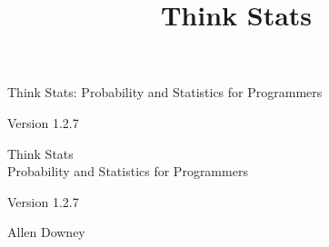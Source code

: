 \documentclass[12pt]{book}
\title{Think Stats}
\newcommand{\theversion}{1.2.7}
\begin{document}
\frontmatter




\newtheorem{ex}{Exercise}[chapter]

\begin{latexonly}

\renewcommand{\blankpage}{\thispagestyle{empty} \quad \newpage}



\thispagestyle{empty}

\begin{flushright}
\vspace*{2.0in}

\begin{spacing}{3}
{\huge Think Stats: Probability and Statistics for Programmers}\\
{\Large }
\end{spacing}

\vspace{0.25in}

Version \theversion

\vfill

\end{flushright}


\blankpage
\blankpage

\pagebreak
\thispagestyle{empty}

\begin{flushright}
\vspace*{2.0in}

\begin{spacing}{3}
{\huge Think Stats}\\
{\Large Probability and Statistics for Programmers}
\end{spacing}

\vspace{0.25in}

Version \theversion

\vspace{1in}


{\Large
Allen Downey\\
}



\end{flushright}
\end{latexonly}
\end{document}
